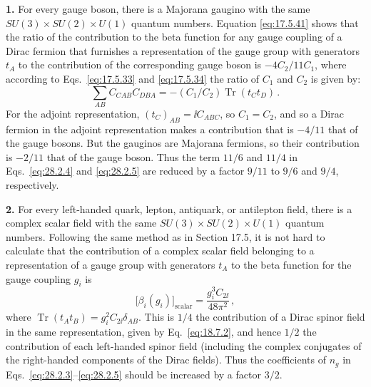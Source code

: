 \noindent\textbf{1.}\quad
For every gauge boson, there is a Majorana gaugino with the same
\(SU(3)\times SU(2)\times U(1)\) quantum numbers. Equation
\eqref{eq:17.5.41} shows that the ratio of the contribution to the beta
function for any gauge coupling of a Dirac fermion that furnishes a
representation of the gauge group with generators \(t_A\) to the
contribution of the corresponding gauge boson is \(-4C_2/11C_1\), where
according to Eqs.~\eqref{eq:17.5.33} and \eqref{eq:17.5.34} the ratio of
\(C_1\) and \(C_2\) is given by:
\begin{equation}
  \sum_{AB}C_{CAB}C_{DBA}
  =-(C_1/C_2)\operatorname{Tr}(t_Ct_D)\,.
  \tag{28.2.6}\label{eq:28.2.6}
\end{equation}
For the adjoint representation, \((t_C)_{AB}=\ii C_{ABC}\), so \(C_1=C_2\),
and so a Dirac fermion in the adjoint representation makes a contribution
that is \(-4/11\) that of the gauge bosons. But the gauginos are Majorana
fermions, so their contribution is \(-2/11\) that of the gauge boson. Thus
the term \(11/6\) and \(11/4\) in Eqs.~\eqref{eq:28.2.4} and
\eqref{eq:28.2.5} are reduced by a factor \(9/11\) to \(9/6\) and \(9/4\),
respectively.

\noindent\textbf{2.}\quad
For every left-handed quark, lepton, antiquark, or antilepton field, there
is a complex scalar field with the same
\(SU(3)\times SU(2)\times U(1)\) quantum numbers. Following the same method
as in Section 17.5, it is not hard to calculate that the contribution of a
complex scalar field belonging to a representation of a gauge group with
generators \(t_A\) to the beta function for the gauge coupling \(g_i\) is
\begin{equation}
  \bigl[\beta_i(g_i)\bigr]_{\mathrm{scalar}}
  =\frac{g_i^3C_{2\ii}}{48\pi^2}\,,
  \tag{28.2.7}\label{eq:28.2.7}
\end{equation}
where \(\operatorname{Tr}(t_At_B)=g_i^2C_{2\ii}\delta_{AB}\). This is \(1/4\)
the contribution of a Dirac spinor field in the same representation, given
by Eq.~\eqref{eq:18.7.2}, and hence \(1/2\) the contribution of each
left-handed spinor field (including the complex conjugates of the
right-handed components of the Dirac fields). Thus the coefficients of
\(n_g\) in Eqs.~\eqref{eq:28.2.3}--\eqref{eq:28.2.5} should be increased
by a factor \(3/2\).

